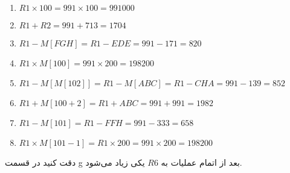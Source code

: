 \\
\linebreak
{}
\makeatletter
\newcommand{\xslalph}[1]{\expandafter\@xslalph\csname c@#1\endcsname}
\newcommand{\@xslalph}[1]{%
    \ifcase#1\or a\or b\or c\or d\or e\or f\or g\or h\or i%
    \or j\or k\or l\or m\or n\or o\or p\or q\or r\or s\or%
    \or t\or u\or v\or w\or x\or y\or z%
    \else\@ctrerr\fi%
}
\makeatother
\begin{latin}
\begin{enumerate}[label=\xslalph*)]
    \item $R1 \times 100 = 991 \times 100 = 991000$
    \item $R1 + R2 = 991 + 713 = 1704$
    \item $R1 - M[FGH] = R1 - EDE = 991 - 171 = 820$
    \item $R1 \times M[100] = 991 \times 200 = 198200$
    \item $R1 - M[M[102]] = R1 - M[ABC] = R1 - CHA = 991 - 139 = 852$
    \item $R1 + M[100 + 2] = R1 + ABC = 991 + 991 = 1982$
    \item $R1 - M[101] = R1 - FFH = 991 - 333 = 658$
    \item $R1 \times M[101 - 1] = R1 \times 200 = 991 \times 200 = 198200$
\end{enumerate}
\end{latin}
دقت کنید در قسمت
g
بعد از اتمام عملیات به
$R6$
یکی زیاد می‌شود.